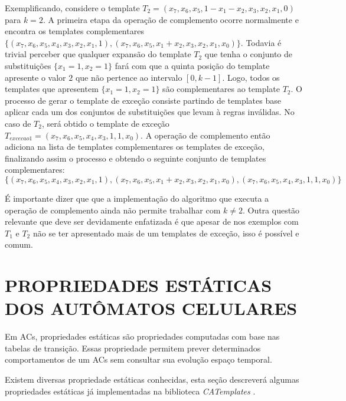 \documentclass[12pt,a4paper]{article}
\let\stdsection\section
\renewcommand\section{\newpage\stdsection}
\begin{document}
	Exemplificando, considere o template $T_2 = (x_7, x_6, x_5, 1 - x_1 - x_2, x_3, x_2, x_1, 0)$ para $k=2$. A primeira etapa da operação de complemento ocorre normalmente e encontra os templates complementares $\{(x_7, x_6, x_5, x_4, x_3, x_2, x_1, 1),(x_7, x_6, x_5, x_1 + x_2, x_3, x_2, x_1, x_0)\}$. Todavia é trivial perceber que qualquer expansão do template $T_2$ que tenha o conjunto de substituições $\{x_1 = 1, x_2 = 1\}$ fará com que a quinta posição do template apresente o valor $2$ que não pertence ao intervalo $[0,k-1]$. Logo, todos os templates que apresentem $\{x_1 = 1, x_2 = 1\}$ são complementares ao template $T_2$. O processo de gerar o template de exceção consiste partindo de templates base aplicar cada um dos conjuntos de substituições que levam à regras inválidas. No caso de $T_2$, será obtido o template de exceção $T_{excecao 1} = (x_7, x_6, x_5, x_4, x_3, 1, 1, x_0)$. A operação de complemento então adiciona na lista de templates complementares os templates de exceção, finalizando assim o processo e obtendo o seguinte conjunto de templates complementares:
	\begin{equation}
	\{(x_7, x_6, x_5, x_4, x_3, x_2, x_1, 1),(x_7, x_6, x_5, x_1 + x_2, x_3, x_2, x_1, x_0),(x_7, x_6, x_5, x_4, x_3, 1, 1, x_0)\}
	\label{eq:complementionSet}
	\end{equation}

	É importante dizer que que a implementação do algoritmo que executa a operação de complemento ainda não permite trabalhar com $k\neq 2$. Outra questão relevante que deve ser devidamente enfatizada é que apesar de nos exemplos com $T_1$ e $T_2$ não se ter apresentado mais de um templates de exceção, isso é possível e comum.









\section{PROPRIEDADES ESTÁTICAS DOS AUTÔMATOS CELULARES}\label{sec:propriedadesEstaticas}

	Em ACs, propriedades estáticas são propriedades computadas com base nas tabelas de transição. Essas propriedade permitem prever determinados comportamentos de um ACs sem consultar sua evolução espaço temporal. 

	Existem diversas propriedade estáticas conhecidas, esta seção descreverá algumas propriedades estáticas já implementadas na biblioteca \textit{CATemplates} \cite{CATemplates}.
\end{document}
